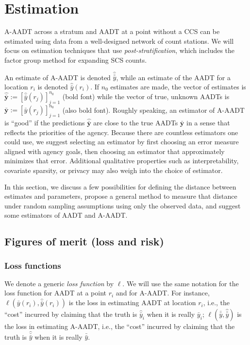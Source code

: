 \documentclass[11pt]{article}
\begin{document}
    \section{Estimation}\label{estimation}

A-AADT across a stratum and AADT at a point without a CCS can be
estimated using data from a well-designed network of count stations. We
will focus on estimation techniques that use \emph{post-stratification},
which includes the factor group method for expanding SCS counts.

An estimate of A-AADT is denoted \(\hat{\bar{\bar{y}}}\), while an
estimate of the AADT for a location \(r_i\) is denoted
\(\hat{\bar{y}}(r_i)\). If \(n_0\) estimates are made, the vector of
estimates is
\(\hat{\bar{\mathbf{y}}} := [\hat{\bar{y}}(r_j)]_{j = 1}^{n_0}\) (bold
font) while the vector of true, unknown AADTs is
\(\bar{\mathbf{y}} := [\bar{y}(r_j)]_{j = 1}^{n_0}\) (also bold font).
Roughly speaking, an estimator of A-AADT is ``good'' if the predictions
\(\hat{\bar{\mathbf{y}}}\) are close to the true AADTs
\(\bar{\mathbf{y}}\) in a sense that reflects the priorities of the
agency. Because there are countless estimators one could use, we suggest
selecting an estimator by first choosing an error measure aligned with
agency goals, then choosing an estimator that approximately minimizes
that error. Additional qualitative properties such as interpretability,
covariate sparsity, or privacy may also weigh into the choice of
estimator.

In this section, we discuss a few possibilities for defining the
distance between estimates and parameters, propose a general method to
measure that distance under random sampling assumptions using only the
observed data, and suggest some estimators of AADT and A-AADT.

\subsection{Figures of merit (loss and
risk)}\label{figures-of-merit-loss-and-risk}

\subsubsection{Loss functions}\label{loss-functions}

We denote a generic \emph{loss function} by \(\ell\). We will use the
same notation for the loss function for AADT at a point \(r_i\) and for
A-AADT. For instance, \(\ell(\bar{y}(r_i), \hat{\bar{y}}(r_i))\) is the
loss in estimating AADT at location \(r_i\), i.e., the ``cost'' incurred
by claiming that the truth is \(\hat{\bar{y}}_i\) when it is really
\(\bar{y}_i\); \(\ell(\bar{\bar{y}}, \hat{\bar{\bar{y}}})\) is the loss
in estimating A-AADT, i.e., the ``cost'' incurred by claiming that the
truth is \(\hat{\bar{\bar{y}}}\) when it is really \(\bar{\bar{y}}\).
\end{document}
